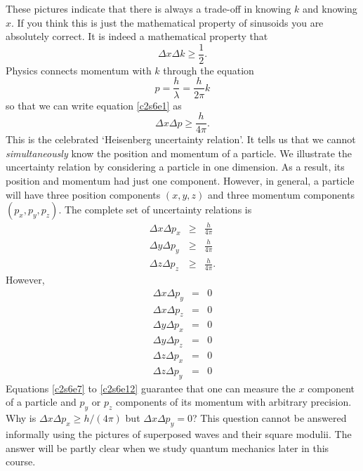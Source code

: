 These pictures indicate that there is always a trade-off in knowing $k$ and
knowing $x$. If you think this is just the mathematical property of sinusoids
you are absolutely correct. It is indeed a mathematical property that
\begin{equation}\label{c2s6e1}
\Delta x \Delta k \ge \frac{1}{2}.
\end{equation}
Physics connects momentum with $k$ through the equation
\begin{equation}\label{c2s6e2}
p = \frac{h}{\lambda} = \frac{h}{2\pi}k
\end{equation}
so that we can write equation \eqref{c2s6e1} as
\begin{equation}\label{c2s6e3}
\Delta x \Delta p \ge \frac{h}{4\pi}.
\end{equation}
This is the celebrated `Heisenberg uncertainty relation'. It tells us that
we cannot \emph{simultaneously} know the position and momentum of a particle.
We illustrate the uncertainty relation by considering a particle in one 
dimension. As a result, its position and momentum had just one component. 
However, in general, a particle will have three position components $(x, y, z)$
and three momentum components $(p_x, p_y, p_z)$. The complete set of uncertainty
relations is
\begin{eqnarray}
\Delta x \Delta p_x &\ge& \frac{h}{4\pi} \label{c2s6e4} \\
\Delta y \Delta p_y &\ge& \frac{h}{4\pi} \label{c2s6e5} \\
\Delta z \Delta p_z &\ge& \frac{h}{4\pi}. \label{c2s6e6}
\end{eqnarray}
However,
\begin{eqnarray}
\Delta x \Delta p_y &=& 0 \label{c2s6e7} \\
\Delta x \Delta p_z &=& 0 \label{c2s6e8} \\
\Delta y \Delta p_x &=& 0 \label{c2s6e9} \\
\Delta y \Delta p_z &=& 0 \label{c2s6e10} \\
\Delta z \Delta p_x &=& 0 \label{c2s6e11} \\
\Delta z \Delta p_y &=& 0 \label{c2s6e12}
\end{eqnarray}
Equations \eqref{c2s6e7} to \eqref{c2s6e12} guarantee that one can measure the
$x$ component of a particle and $p_y$ or $p_z$ components of its momentum with
arbitrary precision. Why is $\Delta x \Delta p_x \ge h/(4\pi)$ but $\Delta x
\Delta p_y = 0$? This question cannot be answered informally using the pictures
of superposed waves and their square modulii. The answer will be partly clear
when we study quantum mechanics later in this course.


